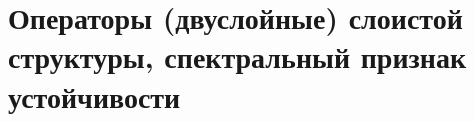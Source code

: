 \documentclass[__main__.tex]{subfiles}
\begin{document}
\section{Операторы (двуслойные) слоистой структуры, спектральный признак устойчивости}
\end{document}
